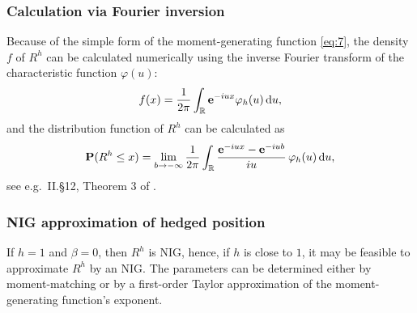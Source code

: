\subsubsection{Calculation via Fourier inversion}
\label{sec:calc-via-four}

Because of the simple form of the moment-generating function
\eqref{eq:7}, the density $f$ of $R^h$ can be calculated numerically
using the inverse Fourier transform of the characteristic function
$\varphi(u) $:
\begin{equation*}
  f(x) = \frac{1}{2\pi} \int_{\mathbb{R}} {\bf e}^{-i u x} \varphi_h(u)\, {\rm d} u, 
\end{equation*}
and the distribution function of $R^h$ can be calculated as
\begin{equation*}
  {\bf P}(R^h\leq x) = \lim_{b\rightarrow-\infty} \frac{1}{2\pi} \int_{\mathbb{R}}
  \frac{{\bf e}^{-i u x} - {\bf e}^{-i u b}}{i u}\, \varphi_h(u)\, {\rm d} u,
\end{equation*}
see e.g.\ II.\S 12, Theorem 3 of \citep{Shiryaev1996}.


\subsubsection{NIG approximation of hedged position}
\label{sec:nig-appr-hedg}

If $h=1$ and $\beta=0$, then $R^h$ is NIG, hence, if $h$ is close to
$1$, it may be feasible to approximate $R^h$ by an NIG. The parameters
can be determined either by moment-matching or by a first-order Taylor
approximation of the moment-generating function's exponent.


